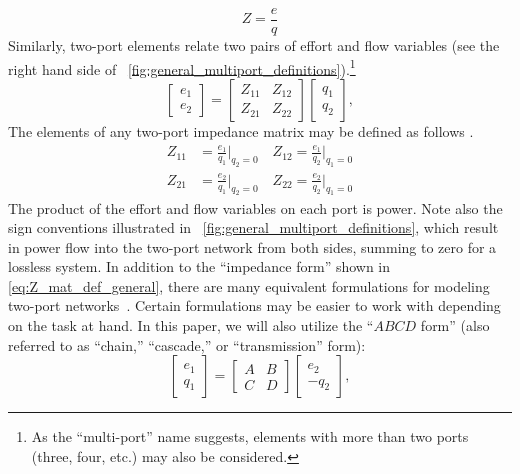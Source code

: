 \documentclass[5p,times]{elsarticle}
\begin{document}
%
\begin{equation}
        Z = \frac{e}{q}
\end{equation}
%
Similarly, two-port elements relate two pairs of effort and flow variables (see the right hand side of \figurename~\ref{fig:general_multiport_definitions}).\footnote{As the ``multi-port'' name suggests, elements with more than two ports (three, four, etc.) may also be considered.}
%
\begin{equation} \label{eq:Z_mat_def_general}
        \begin{bmatrix} e_1 \\ e_2 \end{bmatrix} = \begin{bmatrix} Z_{11} & Z_{12} \\ Z_{21} & Z_{22} \end{bmatrix} \begin{bmatrix} q_1 \\ q_2 \end{bmatrix},
\end{equation}
%
The elements of any two-port impedance matrix may be defined as follows \cite{CircuitFundamental}.
%
\begin{equation} \label{eq:Z_mat_elements_def}
        \begin{aligned}
                Z_{11}& = \frac{e_1}{q_1} \bigg \vert_{q_2=0} \quad
                Z_{12} = \frac{e_1}{q_2} \bigg \vert_{q_1=0}  \\[1em]
                Z_{21}& = \frac{e_2}{q_1} \bigg \vert_{q_2=0} \quad
                Z_{22} = \frac{e_2}{q_2} \bigg \vert_{q_1=0} 
        \end{aligned}
\end{equation}
%
The product of the effort and flow variables on each port is power.
Note also the sign conventions illustrated in \figurename~\ref{fig:general_multiport_definitions}, which result in power flow into the two-port network from both sides, summing to zero for a lossless system.
%
In addition to the ``impedance form'' shown in \eqref{eq:Z_mat_def_general}, there are many equivalent formulations for modeling two-port networks~\cite{CircuitFundamental}.
Certain formulations may be easier to work with depending on the task at hand.
In this paper, we will also utilize the ``$ABCD$ form'' (also referred to as ``chain,'' ``cascade,'' or ``transmission'' form):
%
\begin{equation}
        \label{eq:abcd_mat_def_general}
        \begin{bmatrix} e_1 \\ q_1 \end{bmatrix}
        = 
        \begin{bmatrix} A & B \\ C & D \end{bmatrix}
        \begin{bmatrix} e_2 \\ - q_2 \end{bmatrix},
\end{equation}
\end{document}
